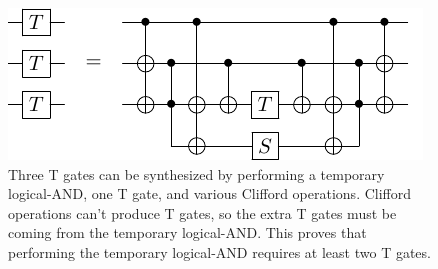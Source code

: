 \documentclass[twocolumn]{revtex4-1}
\begin{document}
\begin{figure}[H]
  \includegraphics[width=\linewidth]{synthesize-t-gates-from-temporary-logical-and.pdf}
  \caption{
	Three T gates can be synthesized by performing a temporary logical-AND, one T gate, and various Clifford operations.
	Clifford operations can't produce T gates, so the extra T gates must be coming from the temporary logical-AND.
	This proves that performing the temporary logical-AND requires at least two T gates.
  }
  \label{fig:synthesize-t-gates-from-temporary-logical-and}
\end{figure}
\end{document}
